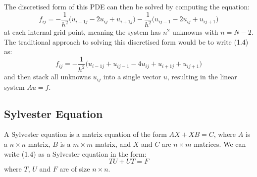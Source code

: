 \documentclass[11pt]{article}
\numberwithin{equation}{section}
\begin{document}
The discretised form of this PDE can then be solved by computing the equation:
	\begin{equation}
	f_{ij} = -\frac{1}{h^2} \big( u_{i-1j} - 2u_{ij} + u_{i+1j} \big) - \frac{1}{h^2} \big( u_{ij-1} - 2u_{ij} + u_{ij+1} \big)
	\end{equation}
at each internal grid point, meaning the system has $n^2$ unknowns with $n=N-2$. The traditional approach to solving this discretised form would be to write (1.4) as:
	\begin{equation}
	f_{ij} = -\frac{1}{h^2} \big( u_{i-1j} + u_{ij-1} - 4u_{ij} + u_{i+1j} + u_{ij+1}  \big)
	\end{equation}
and then stack all unknowns $u_{ij}$ into a single vector $u$, resulting in the linear system $Au=f$. 

\subsection{Sylvester Equation}
A Sylvester equation is a matrix equation of the form $AX + XB = C$, where $A$ is a $n \times n$ matrix, $B$ is a $m \times m$ matrix, and $X$ and $C$ are $n \times m$ matrices. We can write (1.4) as a Sylvester equation in the form:
	\begin{equation}
	TU + UT = F
	\end{equation}
where $T$, $U$ and $F$ are of size $n \times n$.
\end{document}
